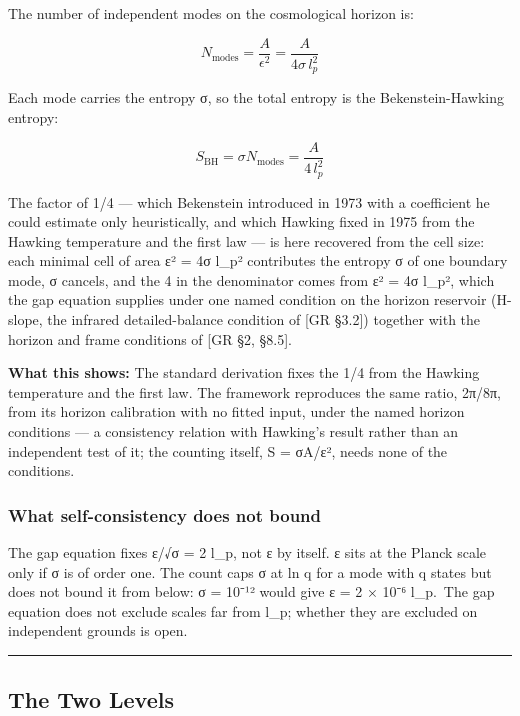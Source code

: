 \documentclass[
]{article}
\begin{document}
The number of independent modes on the cosmological horizon is:

\[N_{\text{modes}} = \frac{A}{\epsilon^2} = \frac{A}{4\sigma \, l_p^2}\]

Each mode carries the entropy σ, so the total entropy is the
Bekenstein-Hawking entropy:

\[S_{\text{BH}} = \sigma N_{\text{modes}} = \frac{A}{4 \, l_p^2}\]

The factor of 1/4 --- which Bekenstein introduced in 1973 with a
coefficient he could estimate only heuristically, and which Hawking
fixed in 1975 from the Hawking temperature and the first law --- is here
recovered from the cell size: each minimal cell of area ε² = 4σ l\_p²
contributes the entropy σ of one boundary mode, σ cancels, and the 4 in
the denominator comes from ε² = 4σ l\_p², which the gap equation
supplies under one named condition on the horizon reservoir (H-slope,
the infrared detailed-balance condition of {[}GR §3.2{]}) together with
the horizon and frame conditions of {[}GR §2, §8.5{]}.

\textbf{What this shows:} The standard derivation fixes the 1/4 from the
Hawking temperature and the first law. The framework reproduces the same
ratio, 2π/8π, from its horizon calibration with no fitted input, under
the named horizon conditions --- a consistency relation with Hawking's
result rather than an independent test of it; the counting itself, S =
σA/ε², needs none of the conditions.

\hypertarget{what-self-consistency-does-not-bound}{%
\subsubsection{What self-consistency does not
bound}\label{what-self-consistency-does-not-bound}}

The gap equation fixes ε/√σ = 2 l\_p, not ε by itself. ε sits at the
Planck scale only if σ is of order one. The count caps σ at ln q for a
mode with q states but does not bound it from below: σ = 10⁻¹² would
give ε = 2 × 10⁻⁶ l\_p.~The gap equation does not exclude scales far
from l\_p; whether they are excluded on independent grounds is open.

\begin{center}\rule{0.5\linewidth}{0.5pt}\end{center}

\hypertarget{the-two-levels}{%
\subsection{The Two Levels}\label{the-two-levels}}
\end{document}

